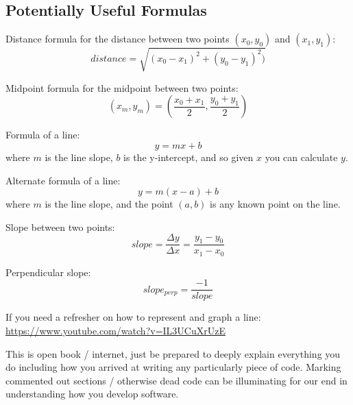 \documentclass[12pt]{article}
\newcommand{\nl}{\newline}
\begin{document}
\subsection*{Potentially Useful Formulas}

\noindent
Distance formula for the distance between two points $(x_0, y_0)$ and $(x_1,
y_1)$:
$$distance = \sqrt{(x_0 - x_1)^2 + (y_0 - y_1)^2)}$$

\noindent\nl
Midpoint formula for the midpoint between two points:
$$(x_m, y_m) = (\frac{x_0+x_1}{2}, \frac{y_0+y_1}{2})$$

\noindent\nl
Formula of a line:
$$y = mx + b$$ 
where $m$ is the line slope, $b$ is the
y-intercept, and so given $x$ you can calculate $y$.

\noindent\nl
Alternate formula of a line:
$$y = m(x-a)+b$$
where $m$ is the line slope, and the
point $(a,b)$ is any known point on the line.

\noindent\nl
Slope between two points:
$$slope = \frac{\Delta y}{\Delta x} = \frac{y_1 - y_0}{x_1 - x_0}$$

\noindent\nl
Perpendicular slope:
$$slope_{perp} = \frac{-1}{slope}$$

If you need a refresher on how to represent and graph a line:
\url{https://www.youtube.com/watch?v=IL3UCuXrUzE}

This is open book / internet, just be prepared to deeply explain everything you
do including how you arrived at writing any particularly piece of code. Marking
commented out sections / otherwise dead code can be illuminating for our end in
understanding how you develop software.
\end{document}
